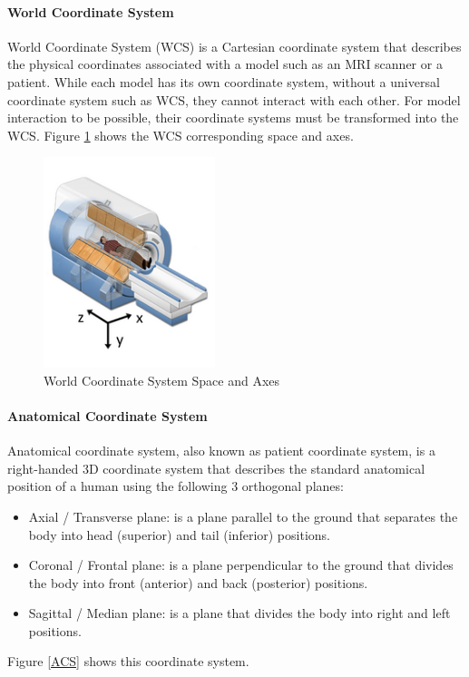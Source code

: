 \documentclass[12pt]{article}
\begin{document}
\paragraph{World Coordinate System}
World Coordinate System (WCS) is a Cartesian coordinate system that describes the physical coordinates associated with a model such as an MRI scanner or a patient. While each model has its own coordinate system, without a universal coordinate system such as WCS, they cannot interact with each other. For model interaction to be possible, their coordinate systems must be transformed into the WCS. Figure \ref{WCS} shows the WCS corresponding space and axes.
\begin{figure}[hbpt!]
\centering
\includegraphics[width=50mm]{worldCoordinateSystem.png}
\caption{World Coordinate System Space and Axes~\cite{slicerWCS}}
\label{WCS}
\end{figure}
\paragraph{Anatomical Coordinate System}
Anatomical coordinate system, also known as patient coordinate system, is a right-handed 3D coordinate system that describes the standard anatomical position of a human using the following 3 orthogonal planes:
\begin{itemize}
\item{Axial / Transverse plane:} is a plane parallel to the ground that separates the body into head (superior) and tail (inferior) positions.
\item{Coronal / Frontal plane:} is a plane perpendicular to the ground that divides the body into front (anterior) and back (posterior) positions.
\item{Sagittal / Median plane:} is a plane that divides the body into right and left positions.
\end{itemize}
Figure \ref{ACS} shows this coordinate system.
\end{document}
